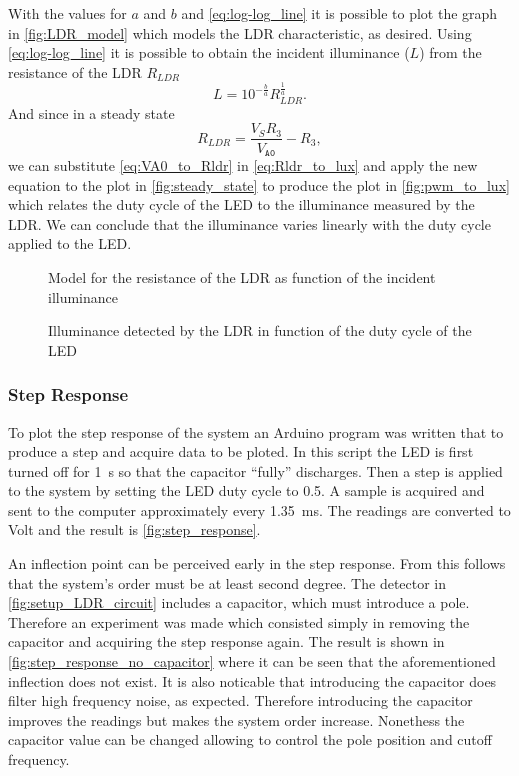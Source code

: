 With the values for $a$ and $b$ and \eqref{eq:log-log_line} it is possible to plot the graph in \autoref{fig:LDR_model} which models the LDR characteristic, as desired. Using \eqref{eq:log-log_line} it is possible to obtain the incident illuminance ($L$) from the resistance of the LDR $R_{LDR}$
\begin{equation} \label{eq:Rldr_to_lux}
    L = 10^{-\frac{b}{a}} R_{LDR}^{\frac{1}{a}} .
\end{equation}
And since in a steady state
\begin{equation} \label{eq:VA0_to_Rldr}
    R_{LDR} = \frac{V_S R_3}{V_{\texttt{A0}}} - R_3 ,
\end{equation}
we can substitute \eqref{eq:VA0_to_Rldr} in \eqref{eq:Rldr_to_lux} and apply the new equation to the plot in \autoref{fig:steady_state} to produce the plot in \autoref{fig:pwm_to_lux} which relates the duty cycle of the LED to the illuminance measured by the LDR. We can conclude that the illuminance varies linearly with the duty cycle applied to the LED.

\begin{figure}[h]
    \centering
    \resizebox{\textwidth}{!}{}
    \caption{Model for the resistance of the LDR as function of the incident illuminance}
    \label{fig:LDR_model}
\end{figure}

\begin{figure}[h]
    \centering
    \resizebox{\textwidth}{!}{}
    \caption{Illuminance detected by the LDR in function of the duty cycle of the LED}
    \label{fig:pwm_to_lux}
\end{figure}


\subsubsection{Step Response}
\label{sub:StepResponse}

To plot the step response of the system an Arduino program was written that to produce a step and acquire data to be ploted. In this script the LED is first turned off for \SI{1}{\second} so that the capacitor ``fully'' discharges. Then a step is applied to the system by setting the LED duty cycle to 0.5. A sample is acquired and sent to the computer approximately every \SI{1.35}{\milli\second}. The readings are converted to Volt and the result is \autoref{fig:step_response}.

An inflection point can be perceived early in the step response. From this follows that the system's order must be at least second degree. The detector in \autoref{fig:setup_LDR_circuit} includes a capacitor, which must introduce a pole. Therefore an experiment was made which consisted simply in removing the capacitor and acquiring the step response again. The result is shown in \autoref{fig:step_response_no_capacitor} where it can be seen that the aforementioned inflection does not exist. It is also noticable that introducing the capacitor does filter high frequency noise, as expected. Therefore introducing the capacitor improves the readings but makes the system order increase. Nonethess the capacitor value can be changed allowing to control the pole position and cutoff frequency.

